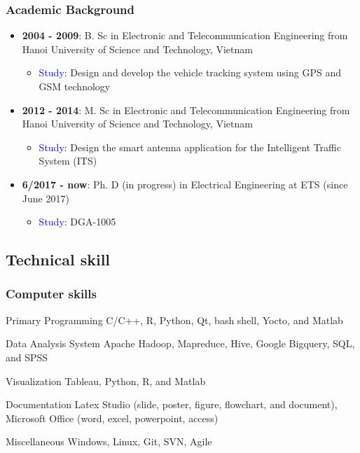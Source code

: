 \documentclass{beamer}
\begin{document}

\begin{frame}
\frametitle{Academic Background}
\begin{itemize}
	\item \textbf{2004 - 2009}: B. Sc in Electronic and Telecommunication Engineering from Hanoi University of Science and Technology, Vietnam 
	\begin{itemize}
		\item \textcolor{blue}{Study}: Design and develop the vehicle tracking system using GPS and GSM technology 
	\end{itemize}
	\item \textbf{2012 - 2014}: M. Sc in Electronic and Telecommunication Engineering from Hanoi University of Science and Technology, Vietnam 
	\begin{itemize}
		\item \textcolor{blue}{Study}: Design the smart antenna application for the Intelligent Traffic System (ITS)
	\end{itemize}
\item\textbf{ 6/2017 - now}: Ph. D (in progress) in Electrical Engineering at ETS (since June 2017) 
\begin{itemize}
	\item \textcolor{blue}{Study}: DGA-1005
\end{itemize}
	
	
\end{itemize}
\end{frame}

\subsection{Technical skill}

\begin{frame}
\frametitle{Computer skills}
\begin{block}{Primary Programming}
C/C++, R, Python, Qt, bash shell, Yocto, and Matlab
\end{block}

\begin{block}{Data Analysis System}
Apache Hadoop, Mapreduce, Hive, Google Bigquery, SQL, and SPSS
\end{block}

\begin{block}{Visualization}
Tableau, Python, R, and Matlab
\end{block}

\begin{block}{Documentation}
	Latex Studio (slide, poster, figure, flowchart, and document), Microsoft Office (word, excel, powerpoint, access)
\end{block}

\begin{block}{Miscellaneous}
Windows, Linux, Git, SVN, Agile
\end{block}



\end{frame}
\end{document}
